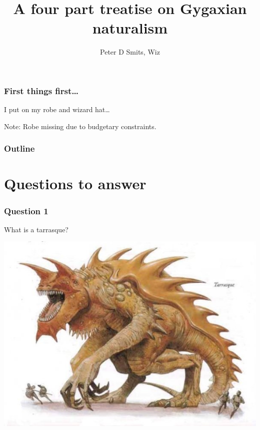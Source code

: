 \documentclass{beamer}\usepackage{graphicx, color}
\title{A four part treatise on Gygaxian naturalism}
\author{Peter D Smits, Wiz}
\institute{
Department of Arcane Biology\\
The Unseen University
}
\begin{document}
\begin{frame}
\titlepage
\end{frame}

\begin{frame}
  \frametitle{First things first\dots}

  \huge{I put on my robe and wizard hat\dots}

  \footnotesize{Note: Robe missing due to budgetary constraints.}

\end{frame}

\begin{frame}
  \frametitle{Outline}
  \tableofcontents
\end{frame}

\section{Questions to answer}
\begin{frame}
  \frametitle{Question 1}
  \Large{What is a tarrasque?}

  \begin{center}
    \includegraphics[height = 0.5\textheight, keepaspectratio = true]{tarrasque_1}
  \end{center}

\end{frame}
\end{document}
